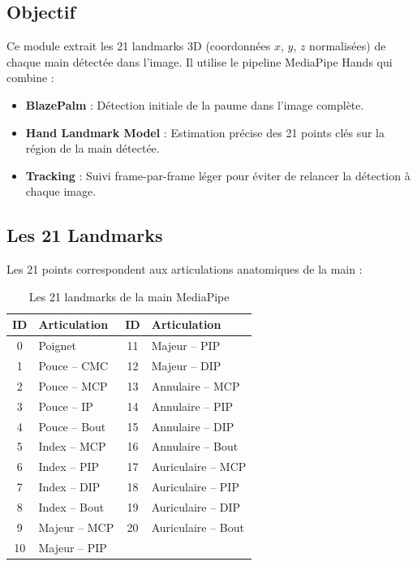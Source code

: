 \subsection{Objectif}

Ce module extrait les 21 landmarks 3D (coordonnées $x$, $y$, $z$ normalisées) de chaque main détectée dans l'image. Il utilise le pipeline MediaPipe Hands qui combine :

\begin{itemize}
    \item \textbf{BlazePalm} : Détection initiale de la paume dans l'image complète.
    \item \textbf{Hand Landmark Model} : Estimation précise des 21 points clés sur la région de la main détectée.
    \item \textbf{Tracking} : Suivi frame-par-frame léger pour éviter de relancer la détection à chaque image.
\end{itemize}

\subsection{Les 21 Landmarks}

Les 21 points correspondent aux articulations anatomiques de la main :

\begin{table}[H]
    \centering
    \begin{tabular}{cl|cl}
        \toprule
        \textbf{ID} & \textbf{Articulation} & \textbf{ID} & \textbf{Articulation} \\
        \midrule
        0 & Poignet & 11 & Majeur -- PIP \\
        1 & Pouce -- CMC & 12 & Majeur -- DIP \\
        2 & Pouce -- MCP & 13 & Annulaire -- MCP \\
        3 & Pouce -- IP & 14 & Annulaire -- PIP \\
        4 & Pouce -- Bout & 15 & Annulaire -- DIP \\
        5 & Index -- MCP & 16 & Annulaire -- Bout \\
        6 & Index -- PIP & 17 & Auriculaire -- MCP \\
        7 & Index -- DIP & 18 & Auriculaire -- PIP \\
        8 & Index -- Bout & 19 & Auriculaire -- DIP \\
        9 & Majeur -- MCP & 20 & Auriculaire -- Bout \\
        10 & Majeur -- PIP & & \\
        \bottomrule
    \end{tabular}
    \caption{Les 21 landmarks de la main MediaPipe}
\end{table}

